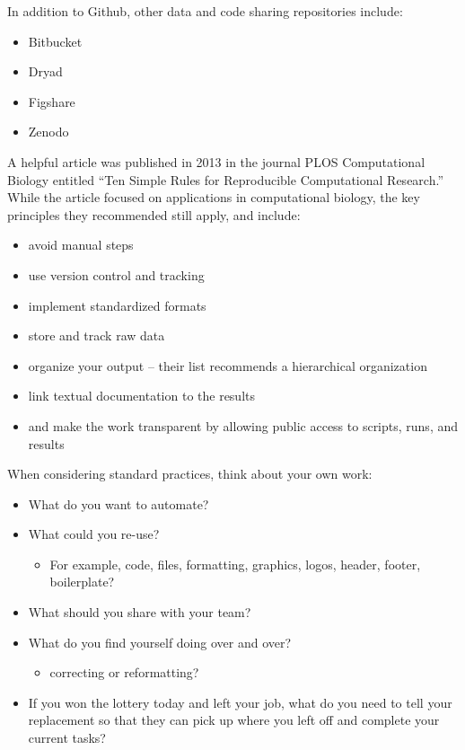 \documentclass[
]{book}
\providecommand{\tightlist}{%
  \setlength{\itemsep}{0pt}\setlength{\parskip}{0pt}}
\begin{document}
In addition to Github, other data and code sharing repositories include:

\begin{itemize}
\tightlist
\item
  Bitbucket
\item
  Dryad
\item
  Figshare
\item
  Zenodo
\end{itemize}

A helpful article was published in 2013 in the journal PLOS Computational Biology entitled ``Ten Simple Rules for Reproducible Computational Research.'' While the article focused on applications in computational biology, the key principles they recommended still apply, and include:

\begin{itemize}
\tightlist
\item
  avoid manual steps
\item
  use version control and tracking
\item
  implement standardized formats
\item
  store and track raw data
\item
  organize your output -- their list recommends a hierarchical organization
\item
  link textual documentation to the results
\item
  and make the work transparent by allowing public access to scripts, runs, and results
\end{itemize}

When considering standard practices, think about your own work:

\begin{itemize}
\tightlist
\item
  What do you want to automate?
\item
  What could you re-use?

  \begin{itemize}
  \tightlist
  \item
    For example, code, files, formatting, graphics, logos, header, footer, boilerplate?
  \end{itemize}
\item
  What should you share with your team?
\item
  What do you find yourself doing over and over?

  \begin{itemize}
  \tightlist
  \item
    correcting or reformatting?
  \end{itemize}
\item
  If you won the lottery today and left your job, what do you need to tell your replacement so that they can pick up where you left off and complete your current tasks?
\end{itemize}
\end{document}
